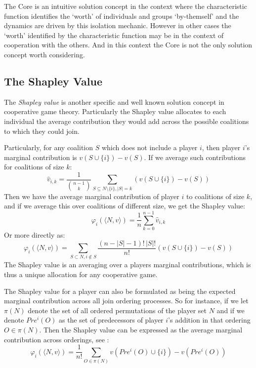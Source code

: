 The Core is an intuitive solution concept in the context where the characteristic function identifies the `worth' of individuals and groups `by-themself' and the dynamics are driven by this isolation mechanic.
However in other cases the `worth' identified by the characteristic function may be in the context of cooperation with the others.
And in this context the Core is not the only solution concept worth considering.

\subsection{The Shapley Value}\label{subsec:the_shapley_value}

The \textit{Shapley value} is another specific and well known solution concept in cooperative game theory.
Particularly the Shapley value allocates to each individual the average contribution they would add across the possible coalitions to which they could join.

Particularly, for any coalition $S$ which does not include a player $i$, then player $i$'s marginal contribution is $v(S\cup\{i\}) - v(S)$. If we average such contributions for coalitions of size $k$:
\begin{equation}\label{eq:shapley_value2}
\hat{v}_{i,k} = \frac{1}{\binom{n-1}{k}}\sum_{S\subseteq N\setminus \{ i\} , |S|=k} %
(v(S\cup\{i\})-v(S))
\end{equation}
Then we have the average marginal contribution of player $i$ to coalitions of size $k$, and if we average this over coalitions of different size, we get the Shapley value:
\begin{equation}\label{shap2} \varphi_i(\langle N,v\rangle) = \frac{1}{n}\sum_{k=0}^{n-1}\hat{v}_{i,k} \end{equation}
Or more directly as:
\begin{equation}\label{shap1_X}\varphi_i(\langle N,v\rangle) = \sum_{S\subset N, i\notin S}\frac{(n-|S|-1)!\,|S|!}{n!}(v(S\cup\{i\})-v(S))\end{equation}
The Shapley value is an averaging over a players marginal contributions, which is thus a unique allocation for any cooperative game.

The Shapley value for a player can also be formulated as being the expected marginal contribution across all join ordering processes.
So for instance, if we let $\pi(N)$ denote the set of all ordered permutations of the player set $N$ and if we denote $Pre^i(O)$ as the set of predecessors of player $i$'s addition in that ordering $O\in \pi(N)$. Then the Shapley value can be expressed as the average marginal contribution across orderings, see \cite{weber_1988}:
\begin{equation}\label{shapley_value3}
    \varphi_i(\langle N,v\rangle) = \frac{1}{n!}\sum_{O\in\pi(N)}v(Pre^i(O)\cup\{i\})-v(Pre^i(O))
\end{equation}

